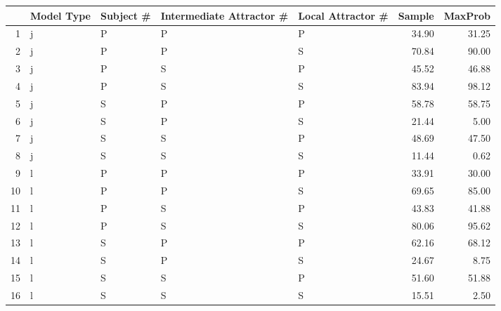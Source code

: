 \begin{tabular}{rllllrr}
  \hline
 & Model Type & Subject \# & Intermediate Attractor \# & Local Attractor \# & Sample & MaxProb \\ 
  \hline
1 & j & P & P & P & 34.90 & 31.25 \\ 
  2 & j & P & P & S & 70.84 & 90.00 \\ 
  3 & j & P & S & P & 45.52 & 46.88 \\ 
  4 & j & P & S & S & 83.94 & 98.12 \\ 
  5 & j & S & P & P & 58.78 & 58.75 \\ 
  6 & j & S & P & S & 21.44 & 5.00 \\ 
  7 & j & S & S & P & 48.69 & 47.50 \\ 
  8 & j & S & S & S & 11.44 & 0.62 \\ 
  9 & l & P & P & P & 33.91 & 30.00 \\ 
  10 & l & P & P & S & 69.65 & 85.00 \\ 
  11 & l & P & S & P & 43.83 & 41.88 \\ 
  12 & l & P & S & S & 80.06 & 95.62 \\ 
  13 & l & S & P & P & 62.16 & 68.12 \\ 
  14 & l & S & P & S & 24.67 & 8.75 \\ 
  15 & l & S & S & P & 51.60 & 51.88 \\ 
  16 & l & S & S & S & 15.51 & 2.50 \\ 
   \hline
\end{tabular}
